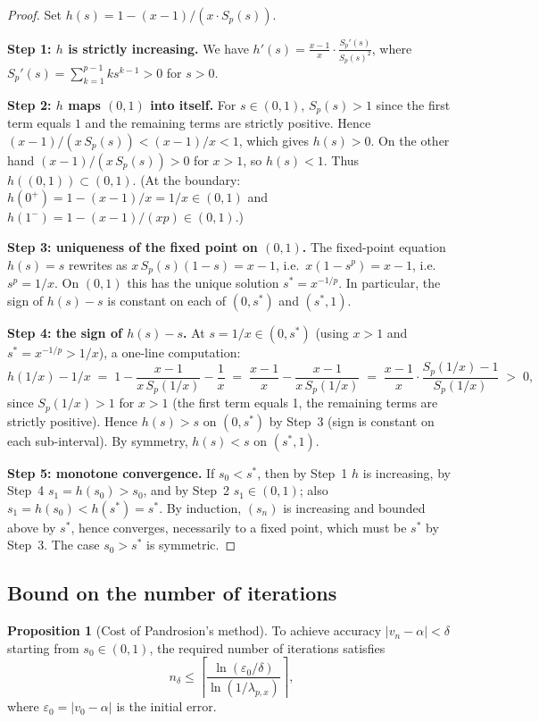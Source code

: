 \documentclass[11pt,a4paper]{article}
\theoremstyle{definition}
\newtheorem{proposition}{Proposition}[section]
\newcommand{\eps}{\varepsilon}
\begin{document}
\begin{proof}
Set $h(s) = 1 - (x-1)/(x \cdot S_p(s))$.

\textbf{Step 1: $h$ is strictly increasing.}
We have $h'(s) = \frac{x-1}{x} \cdot \frac{S_p'(s)}{S_p(s)^2}$, where $S_p'(s) = \sum_{k=1}^{p-1} k s^{k-1} > 0$ for $s > 0$.

\textbf{Step 2: $h$ maps $(0,1)$ into itself.}
For $s \in (0,1)$, $S_p(s) > 1$ since the first term equals $1$ and the remaining terms are strictly positive. Hence
$(x-1)/(x\,S_p(s)) < (x-1)/x < 1$, which gives $h(s) > 0$. On the other hand $(x-1)/(x\,S_p(s)) > 0$ for $x > 1$, so $h(s) < 1$. Thus $h((0,1)) \subset (0,1)$. (At the boundary: $h(0^+) = 1 - (x-1)/x = 1/x \in (0,1)$ and $h(1^-) = 1 - (x-1)/(xp) \in (0,1)$.)

\textbf{Step 3: uniqueness of the fixed point on $(0,1)$.}
The fixed-point equation $h(s) = s$ rewrites as $x\,S_p(s)(1-s) = x - 1$, i.e.\ $x(1 - s^p) = x - 1$, i.e.\ $s^p = 1/x$. On $(0,1)$ this has the unique solution $s^* = x^{-1/p}$. In particular, the sign of $h(s) - s$ is constant on each of $(0, s^*)$ and $(s^*, 1)$.

\textbf{Step 4: the sign of $h(s) - s$.}
At $s = 1/x \in (0, s^*)$ (using $x > 1$ and $s^* = x^{-1/p} > 1/x$), a one-line computation:
\[
  h(1/x) - 1/x
  \;=\; 1 - \frac{x-1}{x\, S_p(1/x)} - \frac{1}{x}
  \;=\; \frac{x-1}{x} - \frac{x-1}{x\, S_p(1/x)}
  \;=\; \frac{x-1}{x} \cdot \frac{S_p(1/x) - 1}{S_p(1/x)}
  \;>\; 0,
\]
since $S_p(1/x) > 1$ for $x > 1$ (the first term equals 1, the remaining terms are strictly positive). Hence $h(s) > s$ on $(0, s^*)$ by Step~3 (sign is constant on each sub-interval). By symmetry, $h(s) < s$ on $(s^*, 1)$.

\textbf{Step 5: monotone convergence.}
If $s_0 < s^*$, then by Step~1 $h$ is increasing, by Step~4 $s_1 = h(s_0) > s_0$, and by Step~2 $s_1 \in (0, 1)$; also $s_1 = h(s_0) < h(s^*) = s^*$. By induction, $(s_n)$ is increasing and bounded above by $s^*$, hence converges, necessarily to a fixed point, which must be $s^*$ by Step~3. The case $s_0 > s^*$ is symmetric.
\end{proof}

\subsection{Bound on the number of iterations}

\begin{proposition}[Cost of Pandrosion's method]
\label{prop:cout}
To achieve accuracy $|v_n - \alpha| < \delta$ starting from $s_0 \in (0,1)$, the required number of iterations satisfies
\[
  n_\delta \leq \left\lceil \frac{\ln(\eps_0 / \delta)}{\ln(1/\lambda_{p,x})} \right\rceil,
\]
where $\eps_0 = |v_0 - \alpha|$ is the initial error.
\end{proposition}
\end{document}
